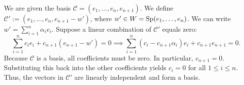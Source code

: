 \begin{exercisesolution}
\label{sol:shifted_family_is_basis}
We are given the basis $\mathcal{C} = (e_1, \dots, e_n, e_{n+1})$. We define $\mathcal{C}' := (e_1, \dots, e_n, e_{n+1} - w')$, where $w' \in W = \operatorname{Sp}(e_1, \dots, e_n)$. We can write $w' = \sum_{i=1}^n \alpha_i e_i$. 
Suppose a linear combination of $\mathcal{C}'$ equals zero:
\[
\sum_{i=1}^n c_i e_i + c_{n+1}(e_{n+1} - w') = 0 \implies \sum_{i=1}^n (c_i - c_{n+1}\alpha_i) e_i + c_{n+1} e_{n+1} = 0.
\]
Because $\mathcal{C}$ is a basis, all coefficients must be zero. In particular, $c_{n+1} = 0$. Substituting this back into the other coefficients yields $c_i = 0$ for all $1 \le i \le n$. Thus, the vectors in $\mathcal{C}'$ are linearly independent and form a basis.
\end{exercisesolution}

